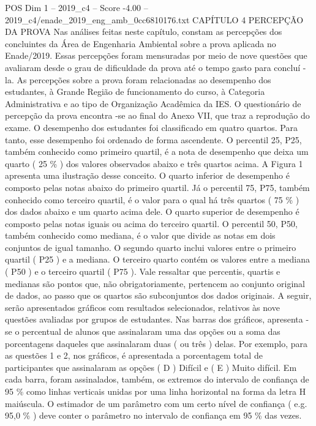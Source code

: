 \begin{textsample}{POS Dim 1 – 2019\_c4 – Score -4.00 – 2019\_c4/enade\_2019\_eng\_amb\_0cc6810176.txt}  \label{ex:f1_pos_342}
CAPÍTULO 4 PERCEPÇÃO DA PROVA Nas análises feitas neste capítulo, constam as percepções dos concluintes da Área de Engenharia Ambiental sobre a prova aplicada no Enade/2019.
Essas percepções foram mensuradas por meio de nove questões que avaliaram desde o grau de dificuldade da prova até o tempo gasto para concluí -la.
As percepções sobre a prova foram relacionadas ao desempenho dos estudantes, à Grande Região de funcionamento do curso, à Categoria Administrativa e ao tipo de Organização Acadêmica da IES.
O questionário de percepção da prova encontra -se ao final do Anexo VII, que traz a reprodução do exame.
O desempenho dos estudantes foi classificado em quatro quartos.
Para tanto, esse desempenho foi ordenado de forma ascendente.
O percentil 25, P25, também conhecido como primeiro quartil, é a nota de desempenho que deixa um quarto ( 25 \% ) dos valores observados abaixo e três quartos acima.
A Figura 1 apresenta uma ilustração desse conceito.
O quarto inferior de desempenho é composto pelas notas abaixo do primeiro quartil.
Já o percentil 75, P75, também conhecido como terceiro quartil, é o valor para o qual há três quartos ( 75 \% ) dos dados abaixo e um quarto acima dele.
O quarto superior de desempenho é composto pelas notas iguais ou acima do terceiro quartil.
O percentil 50, P50, também conhecido como mediana, é o valor que divide as notas em dois conjuntos de igual tamanho.
O segundo quarto inclui valores entre o primeiro quartil ( P25 ) e a mediana.
O terceiro quarto contém os valores entre a mediana ( P50 ) e o terceiro quartil ( P75 ).
Vale ressaltar que percentis, quartis e medianas são pontos que, não obrigatoriamente, pertencem ao conjunto original de dados, ao passo que os quartos são subconjuntos dos dados originais.
A seguir, serão apresentados gráficos com resultados selecionados, relativos às nove questões avaliadas por grupos de estudantes.
Nas barras dos gráficos, apresenta -se o percentual de alunos que assinalaram uma das opções ou a soma das porcentagens daqueles que assinalaram duas ( ou três ) delas.
Por exemplo, para as questões 1 e 2, nos gráficos, é apresentada a porcentagem total de participantes que assinalaram as opções ( D ) Difícil e ( E ) Muito difícil.
Em cada barra, foram assinalados, também, os extremos do intervalo de confiança de 95 \% como linhas verticais unidas por uma linha horizontal na forma da letra H maiúscula.
O estimador de um parâmetro com um certo nível de confiança ( e.g. 95,0 \% ) deve conter o parâmetro no intervalo de confiança em 95 \% das vezes.

\end{textsample}

